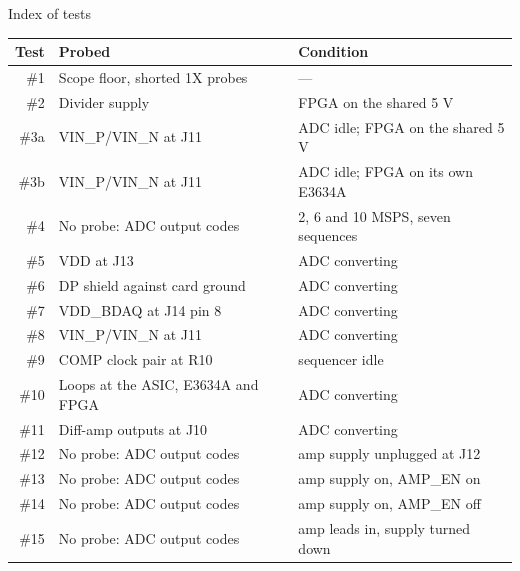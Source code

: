 \begin{frame}{Index of tests}
  \centering
  {\scriptsize
  \begin{tabular}{@{}rll@{}}
    \toprule
    Test & Probed & Condition \\
    \midrule
    \#1 & Scope floor, shorted 1X probes & --- \\
    \#2 & Divider supply & FPGA on the shared 5 V \\
    \#3a & VIN\_P/VIN\_N at J11 & ADC idle; FPGA on the shared 5 V \\
    \#3b & VIN\_P/VIN\_N at J11 & ADC idle; FPGA on its own E3634A \\
    \#4 & No probe: ADC output codes & 2, 6 and 10 MSPS, seven sequences \\
    \#5 & VDD at J13 & ADC converting \\
    \#6 & DP shield against card ground & ADC converting \\
    \#7 & VDD\_BDAQ at J14 pin 8 & ADC converting \\
    \#8 & VIN\_P/VIN\_N at J11 & ADC converting \\
    \#9 & COMP clock pair at R10 & sequencer idle \\
    \#10 & Loops at the ASIC, E3634A and FPGA & ADC converting \\
    \#11 & Diff-amp outputs at J10 & ADC converting \\
    \#12 & No probe: ADC output codes & amp supply unplugged at J12 \\
    \#13 & No probe: ADC output codes & amp supply on, AMP\_EN on \\
    \#14 & No probe: ADC output codes & amp supply on, AMP\_EN off \\
    \#15 & No probe: ADC output codes & amp leads in, supply turned down \\
    \bottomrule
  \end{tabular}
  }
\end{frame}


